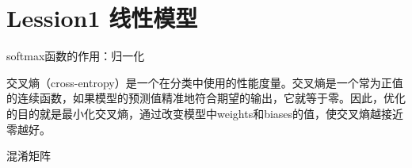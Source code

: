 \documentclass[16pt,UTF8]{ctexart}
\begin{document}
\LARGE
\section{Lession1 线性模型}
softmax函数的作用：归一化
	
\indent 交叉熵（cross-entropy）是一个在分类中使用的性能度量。交叉熵是一个常为正值的连续函数，如果模型的预测值精准地符合期望的输出，它就等于零。因此，优化的目的就是最小化交叉熵，通过改变模型中weights和biases的值，使交叉熵越接近零越好。

\indent 混淆矩阵
\end{document}
